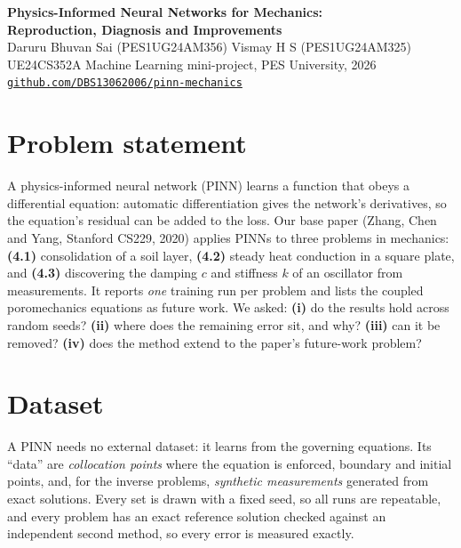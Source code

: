 \documentclass[10pt,a4paper]{article}
\begin{document}
\begin{center}
{\Large\bfseries Physics-Informed Neural Networks for Mechanics:\\[1pt] Reproduction, Diagnosis and Improvements}\\[4pt]
Daruru Bhuvan Sai (PES1UG24AM356) \quad Vismay H S (PES1UG24AM325)\\
UE24CS352A Machine Learning mini-project, PES University, 2026\\
\href{https://github.com/DBS13062006/pinn-mechanics}{\texttt{github.com/DBS13062006/pinn-mechanics}}
\end{center}

\section{Problem statement}
A physics-informed neural network (PINN) learns a function that obeys a differential equation: automatic
differentiation gives the network's derivatives, so the equation's residual can be added to the loss.
Our base paper (Zhang, Chen and Yang, Stanford CS229, 2020) applies PINNs to three problems in
mechanics: \textbf{(4.1)} consolidation of a soil layer, \textbf{(4.2)} steady heat conduction in a square
plate, and \textbf{(4.3)} discovering the damping $c$ and stiffness $k$ of an oscillator from
measurements. It reports \emph{one} training run per problem and lists the coupled poromechanics
equations as future work. We asked:
\textbf{(i)} do the results hold across random seeds? \textbf{(ii)} where does the remaining error sit, and why?
\textbf{(iii)} can it be removed? \textbf{(iv)} does the method extend to the paper's future-work problem?

\section{Dataset}
A PINN needs no external dataset: it learns from the governing equations. Its ``data'' are
\emph{collocation points} where the equation is enforced, boundary and initial points, and, for the
inverse problems, \emph{synthetic measurements} generated from exact solutions. Every set is drawn with a
fixed seed, so all runs are repeatable, and every problem has an exact reference solution checked
against an independent second method, so every error is measured exactly.
\end{document}
